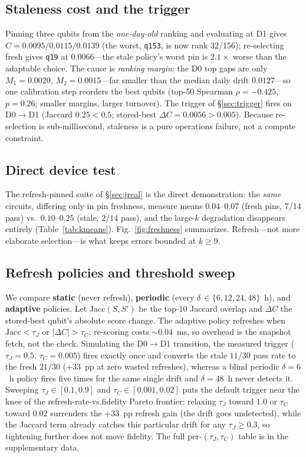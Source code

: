 \documentclass[journal,10pt,twocolumn]{IEEEtran}
\newcommand{\q}[1]{\texttt{q#1}}
\begin{document}
\subsection{Staleness cost and the trigger}
Pinning three qubits from the \emph{one-day-old} ranking and evaluating at D1 gives $C{=}0.0095/0.0115/0.0139$
(the worst, \q{153}, is now rank 32/156); re-selecting fresh gives \q{19} at $0.0066$---the stale policy's worst pin
is $2.1\times$ worse than the adaptable choice. The cause is \emph{ranking margin}: the D0 top gaps are only
$M_1{=}0.0020$, $M_2{=}0.0015$---far smaller than the median daily drift $0.0127$---so one calibration step reorders
the best qubits (top-50 Spearman $\rho{=}{-}0.425$, $p{=}0.26$; smaller margins, larger turnover). The trigger of
\S\ref{sec:trigger} fires on D0$\to$D1
(Jaccard $0.25<0.5$; stored-best $\Delta C{=}0.0056>0.005$). Because re-selection is sub-millisecond, staleness is a
pure operations failure, not a compute constraint.

\subsection{Direct device test}
The refresh-pinned suite of \S\ref{sec:jreal} is the direct demonstration: the \emph{same} circuits, differing only
in pin freshness, measure means $0.04$--$0.07$ (fresh pins, $7/14$ pass) vs.\ $0.10$--$0.25$ (stale, $2/14$ pass),
and the large-$k$ degradation disappears entirely (Table~\ref{tab:kmeans}). Fig.~\ref{fig:freshness} summarizes.
Refresh---not more elaborate selection---is what keeps errors bounded at $k\ge9$.

\subsection{Refresh policies and threshold sweep}
\label{sec:policies}
We compare \textbf{static} (never refresh), \textbf{periodic} (every $\delta\,{\in}\{6,12,24,48\}$~h), and
\textbf{adaptive} policies. Let $\mathrm{Jacc}(S,S')$ be the top-10 Jaccard overlap and $\Delta C$ the stored-best
qubit's absolute score change. The adaptive policy refreshes when $\mathrm{Jacc}<\tau_J$ or $|\Delta C|>\tau_C$;
re-scoring costs $\sim0.04$~ms, so overhead is the snapshot fetch, not the check. Simulating the D0$\to$D1
transition, the measured trigger ($\tau_J{=}0.5$, $\tau_C{=}0.005$) fires exactly once and converts the stale
$11/30$ pass rate to the fresh $21/30$ ($+33$~pp at zero wasted refreshes), whereas a blind periodic $\delta{=}6$~h
policy fires five times for the same single drift and $\delta{=}48$~h never detects it. Sweeping
$\tau_J{\in}[0.1,0.9]$ and $\tau_C{\in}[0.001,0.02]$ puts the default trigger near the knee of the
refresh-rate-vs.\-fidelity Pareto frontier: relaxing $\tau_J$ toward $1.0$ or $\tau_C$ toward $0.02$
surrenders the $+33$~pp refresh gain (the drift goes undetected), while the Jaccard term already catches
this particular drift for any $\tau_J{\ge}0.3$, so tightening further does not move fidelity. The full
per-$(\tau_J,\tau_C)$ table is in the supplementary data.
\end{document}
